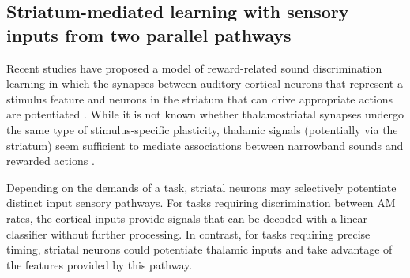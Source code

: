 \subsection{Striatum-mediated learning with sensory inputs from two parallel pathways}

Recent studies have proposed a model of reward-related sound discrimination learning in which the synapses between auditory cortical neurons that represent a stimulus feature and neurons in the striatum that can drive appropriate actions are potentiated \citep{Xiong2015}. 
%
While it is not known whether thalamostriatal synapses undergo the same type of stimulus-specific plasticity, thalamic signals (potentially via the striatum) seem sufficient to mediate associations between narrowband sounds and rewarded actions \citep{Gimenez2015, Guo2018}.
%

Depending on the demands of a task, striatal neurons may selectively potentiate distinct input sensory pathways.
%
For tasks requiring discrimination between AM rates, the cortical inputs provide signals that can be decoded with a linear classifier without further processing.
%
In contrast, for tasks requiring precise timing, striatal neurons could potentiate thalamic inputs and take advantage of the features provided by this pathway. 
